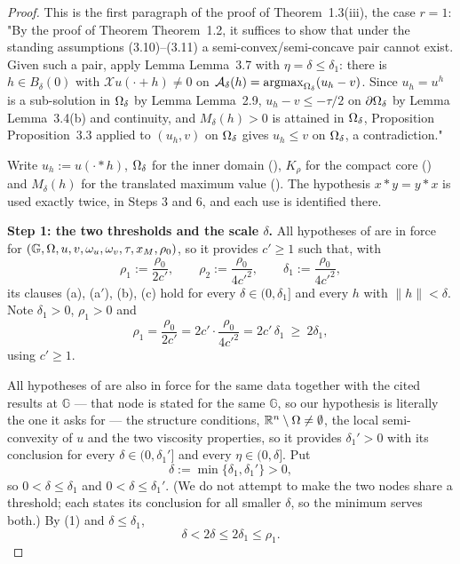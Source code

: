 \begin{proof}
This is the first paragraph of the proof of Theorem~1.3(iii), the case $r=1$: "By the proof of
Theorem Theorem~1.2, it suffices to show that under the standing assumptions
(3.10)--(3.11) a semi-convex/semi-concave pair cannot exist. Given such a pair, apply
Lemma Lemma~3.7 with $\eta=\delta\le\delta_1$: there is $h\in B_\delta(0)$ with
$\mathcal Xu(\cdot+h)\ne0$ on $\mathcal{A}_\delta(h)=\operatorname*{argmax}_{\Omega_\delta}(u_h-v)$. Since $u_h=u^{h}$
is a sub-solution in $\Omega_\delta$ by Lemma Lemma~2.9, $u_h-v\le-\tau/2$ on
$\partial\Omega_\delta$ by Lemma Lemma~3.4(b) and continuity, and $M_\delta(h)>0$ is attained in
$\Omega_\delta$, Proposition Proposition~3.3 applied to $(u_h,v)$ on $\Omega_\delta$ gives $u_h\le v$ on
$\Omega_\delta$, a contradiction."

Write $u_h:=u(\cdot*h)$, $\Omega_\delta$ for the inner domain
(), $K_\rho$ for the compact core () and
$M_\delta(h)$ for the translated maximum value (). The hypothesis
$x*y=y*x$ is used exactly twice, in Steps 3 and 6, and each use is identified there.

\medskip\noindent\textbf{Step 1: the two thresholds and the scale $\delta$.} All hypotheses
of  are in force for
$(\mathbb G,\Omega,u,v,\omega_u,\omega_v,\tau,x_M,\rho_0)$, so it provides $c'\ge1$ such that, with
\[
 \rho_1:=\frac{\rho_0}{2c'},\qquad \rho_2:=\frac{\rho_0}{4c'^{2}},\qquad
 \delta_1:=\frac{\rho_0}{4c'^{2}} ,
\]
its clauses (a), (a$'$), (b), (c) hold for every $\delta\in(0,\delta_1]$ and every $h$ with
$\|h\|<\delta$. Note $\delta_1>0$, $\rho_1>0$ and
\[
 \rho_1=\frac{\rho_0}{2c'}=2c'\cdot\frac{\rho_0}{4c'^{2}}=2c'\,\delta_1\ \ge\ 2\delta_1 ,
 \tag{1}
\]
using $c'\ge1$.

All hypotheses of  are also in force for the same data
together with the cited results at $\mathbb G$ --- that node is stated for the same
$\mathbb G$, so our hypothesis is literally the one it asks for --- the structure conditions,
$\mathbb R^{n}\setminus\Omega\ne\emptyset$,
the local semi-convexity of $u$ and the two viscosity properties, so it provides
$\delta_1'>0$ with its conclusion for every $\delta\in(0,\delta_1']$ and every
$\eta\in(0,\delta]$. Put
\[
 \delta:=\min\{\delta_1,\delta_1'\}>0 ,
\]
so $0<\delta\le\delta_1$ and $0<\delta\le\delta_1'$. (We do not attempt to make the two nodes
share a threshold; each states its conclusion for all smaller $\delta$, so the minimum serves
both.) By (1) and $\delta\le\delta_1$,
\[
 \delta<2\delta\le2\delta_1\le\rho_1 . \tag{2}
\]


\end{proof}
